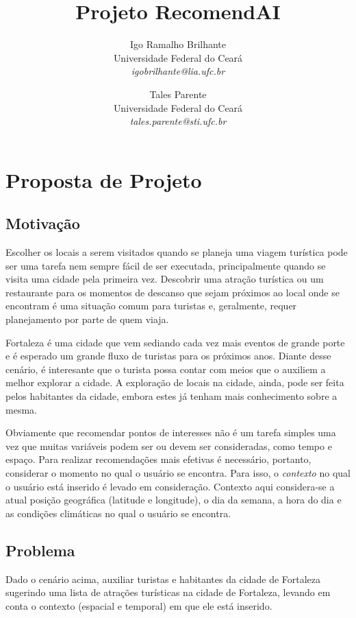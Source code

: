 \documentclass[10pt,a4paper,twocolumn]{article}
\author{Igo Ramalho Brilhante \\ \small{Universidade Federal do Ceará} \\  \small{\textit{igobrilhante@lia.ufc.br}} \and Tales Parente \\  \small{Universidade Federal do Ceará} \\ \small{\textit{tales.parente@sti.ufc.br}} }
\title{Projeto RecomendAI}
\begin{document}
\maketitle

\section{Proposta de Projeto}

\subsection{Motivação}
Escolher os locais a serem visitados quando se planeja uma viagem turística pode ser uma tarefa nem sempre fácil de ser executada, principalmente quando se visita uma cidade pela primeira vez. Descobrir uma atração turística ou um restaurante para os momentos de descanso que sejam próximos ao local onde se encontram é uma situação comum para turistas e, geralmente, requer planejamento por parte de quem viaja.

Fortaleza é uma cidade que vem sediando cada vez mais eventos de grande porte e é esperado um grande fluxo de turistas para os próximos anos. Diante desse cenário, é interesante que o turista possa contar com meios que o auxiliem a melhor explorar a cidade. A exploração de locais na cidade, ainda, pode ser feita pelos habitantes da cidade, embora estes já tenham mais conhecimento sobre a mesma.

Obviamente que recomendar pontos de interesses não é um tarefa simples uma vez que muitas variáveis podem ser ou devem ser consideradas, como tempo e espaço. Para realizar recomendações mais efetivas é necessário, portanto, considerar o momento no qual o usuário se encontra. Para isso, o \emph{contexto} no qual o usuário está inserido é levado em consideração. Contexto aqui considera-se a atual posição geográfica (latitude e longitude), o dia da semana, a hora do dia e as condições climáticas no qual o usuário se encontra.

\subsection{Problema}
Dado o cenário acima, auxiliar turistas e habitantes da cidade de Fortaleza sugerindo uma lista de atrações turísticas na cidade de Fortaleza, levando em conta o contexto (espacial e temporal) em que ele está inserido.
	
\end{document}
